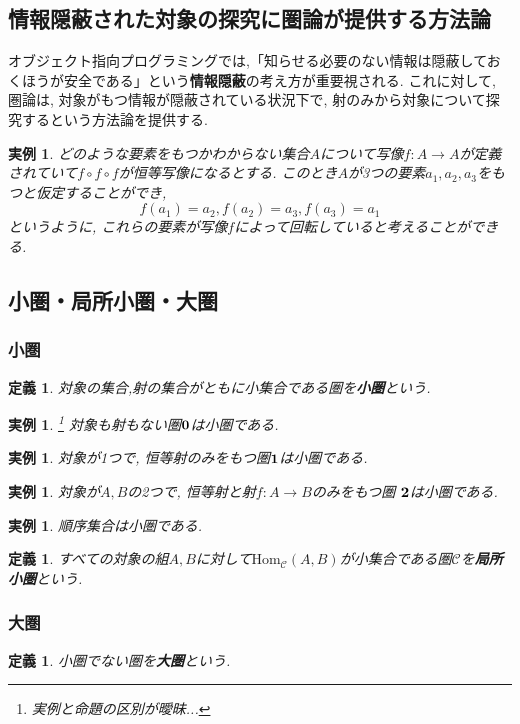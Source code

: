 \documentclass[dvipdfmx]{jsbook}
\theoremstyle{plain}
\newtheorem{Def}[thm]{定義}
\newtheorem{example}[thm]{実例}
\begin{document}
\subsection{情報隠蔽された対象の探究に圏論が提供する方法論}
オブジェクト指向プログラミングでは,「知らせる必要のない情報は隠蔽しておくほうが安全である」という{\bf 情報隠蔽}の考え方が重要視される.
これに対して, 圏論は, 対象がもつ情報が隠蔽されている状況下で, 射のみから対象について探究するという方法論を提供する.
\begin{example}
どのような要素をもつかわからない集合$A$について写像$f:A\rightarrow A$が定義されていて$f\circ f\circ f$が恒等写像になるとする.
このとき$A$が3つの要素$a_1,a_2,a_3$をもつと仮定することができ,
\[
f(a_1)=a_2, f(a_2)=a_3, 
f(a_3)=a_1
\]
というように, これらの要素が写像$f$によって回転していると考えることができる.
\end{example}
\subsection{小圏・局所小圏・大圏}
\subsubsection{小圏}
\begin{Def}
対象の集合,射の集合がともに小集合である圏を{\bf 小圏}という.
\end{Def}
\begin{example}\footnote{実例と命題の区別が曖昧...}
対象も射もない圏${\bf 0}$は小圏である.
\end{example}
\begin{example}
対象が1つで, 恒等射のみをもつ圏${\bf 1}$は小圏である.
\end{example}
\begin{example}
対象が$A,B$の2つで, 
恒等射と射$f:A\rightarrow B$のみをもつ圏
${\bf 2}$は小圏である.
\end{example}
\begin{example}
順序集合は小圏である.
\end{example}
\begin{Def}
すべての対象の組$A,B$に対して$\mathrm{Hom}_{\mathscr{C}}(A,B)$が小集合である圏$\mathscr{C}$を{\bf 局所小圏}という.
\end{Def}
\subsubsection{大圏}
\begin{Def}
小圏でない圏を{\bf 大圏}という.
\end{Def}
\end{document}
